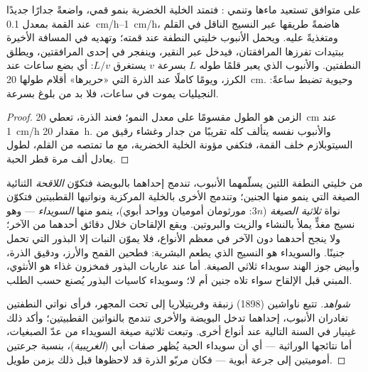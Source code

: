 \begin{theorem}\label{thm:b2:angiosperm-reproduction:tube}
 على  متوافق تستعيد ماءها وتنمي
\emph{}: فتمتد الخلية الخضرية بنمو قمي،
واضعةً جدارًا جديدًا عند القمة بمعدل \qtyrange{0.1}{1}{cm/h}،
هاضمةً طريقها عبر النسيج الناقل في القلم ومتغذيةً عليه. ويحمل
الأنبوب خليتي النطفة عند قمته؛ وتهديه في المسافة الأخيرة ببتيدات
تفرزها المرافقتان، فيدخل  عبر النقير، وينفجر في إحدى
المرافقتين، ويطلق النطفتين. والأنبوب الذي يعبر قلمًا طوله $L$
بسرعة $v$ يستغرق $L/v$: أي بضع ساعات عند الكرز، ويومًا كاملًا عند
الذرة التي «حريرها» أقلام طولها \qty{20}{cm}. وحيوية  تضبط
ساعةً:  النجيليات يموت في ساعات، فلا بد من بلوغ  بسرعة.
\end{theorem}
\begin{proof}
الزمن هو الطول مقسومًا على معدل النمو؛ فعند الذرة، تعطي
\qty{20}{cm} عند \qty{1}{cm/h} مقدار \qty{20}{h}. والأنبوب نفسه
يتألف كله تقريبًا من جدار وغشاء رقيق من السيتوبلازم خلف القمة،
فتكفي مؤونة الخلية الخضرية، مع ما تمتصه من القلم، لطول يعادل ألف
مرة قطر الحبة.
\end{proof}

\begin{proposition}\label{prop:b2:angiosperm-reproduction:double}
من خليتي النطفة اللتين يسلّمهما الأنبوب، تندمج إحداهما بالبويضة
فتكوّن \emph{اللاقحة} الثنائية الصيغة التي ينمو منها الجنين؛
وتندمج الأخرى بالخلية المركزية ونواتيها القطبيتين فتكوّن نواة
\emph{ثلاثية الصيغة} ($3n$: مورثومان أموميان وواحد أبوي)، ينمو منها
\emph{السويداء} --- وهو نسيج مغذٍّ يملأ  بالنشاء والزيت
والبروتين. ويقع الإلقاحان خلال دقائق أحدهما من الآخر؛ ولا ينجح
أحدهما دون الآخر في معظم الأنواع، فلا يموّن النبات إلا البذور التي
تحمل جنينًا. والسويداء هو النسيج الذي يطعم البشرية: فطحين القمح
والأرز، ودقيق الذرة، وأبيض جوز الهند سويداء ثلاثي الصيغة. أما عند
عاريات البذور فمخزون غذاء  هو  الأنثوي، المبني
قبل الإلقاح سواء تلاه جنين أم لا؛ وسويداء كاسيات البذور يُصنع
حسب الطلب.
\end{proposition}
\begin{proof}[شواهد]
تتبع ناواشين (1898)  زنبقة وفريتيلاريا إلى 
تحت المجهر، فرأى نواتي النطفتين تغادران الأنبوب، إحداهما تدخل
البويضة والأخرى تندمج بالنواتين القطبيتين؛ وأكد ذلك غينيار في السنة
التالية عند أنواع أخرى. وتبعت ثلاثية صيغة السويداء من عدّ
الصبغيات، أما نتائجها الوراثية --- أي أن سويداء الحبة يُظهر صفات أبي
 (\emph{الغريبية})، بنسبة جرعتين
أموميتين إلى جرعة أبوية --- فكان مربّو الذرة قد لاحظوها قبل ذلك
بزمن طويل.
\end{proof}

